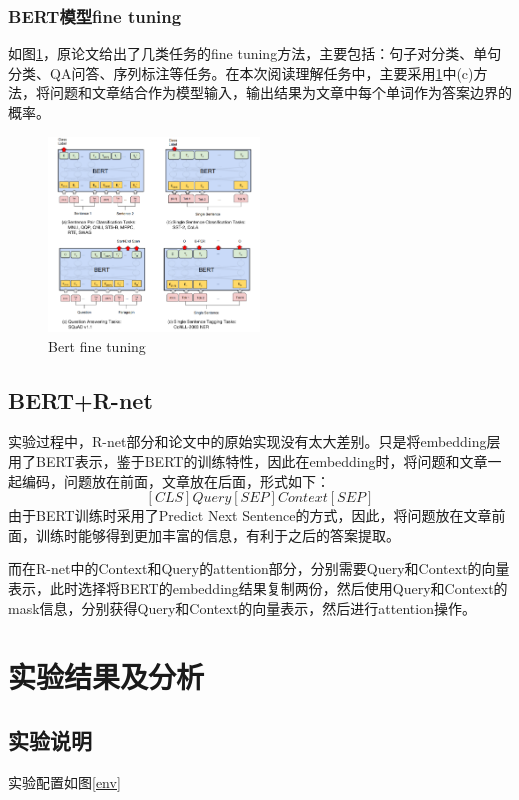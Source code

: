 \documentclass[10pt, a4]{extarticle}
\begin{document}
\subsubsection{BERT模型fine tuning}
如图\ref{fine_tuning}，原论文给出了几类任务的fine tuning方法，主要包括：句子对分类、单句分类、QA问答、序列标注等任务。在本次阅读理解任务中，主要采用\ref{fine_tuning}中(c)方法，将问题和文章结合作为模型输入，输出结果为文章中每个单词作为答案边界的概率。
\begin{figure}[H]
	\centering
	\includegraphics[width=0.5\textwidth]{figure/Bert_fine_tuning.png}
	\caption{Bert fine tuning}
	\label{fine_tuning}
\end{figure}


\subsection{BERT+R-net}
实验过程中，R-net部分和论文中的原始实现没有太大差别。只是将embedding层用了BERT表示，鉴于BERT的训练特性，因此在embedding时，将问题和文章一起编码，问题放在前面，文章放在后面，形式如下：
$$
[CLS]Query[SEP]Context[SEP]
$$
由于BERT训练时采用了Predict Next Sentence的方式，因此，将问题放在文章前面，训练时能够得到更加丰富的信息，有利于之后的答案提取。

而在R-net中的Context和Query的attention部分，分别需要Query和Context的向量表示，此时选择将BERT的embedding结果复制两份，然后使用Query和Context的mask信息，分别获得Query和Context的向量表示，然后进行attention操作。

\section{实验结果及分析}
\subsection{实验说明}
实验配置如图\ref{env}
\begin{table}[H]
	\centering
	\caption{BERT运行环境配置}
	\label{env}
\end{table}
\end{document}
